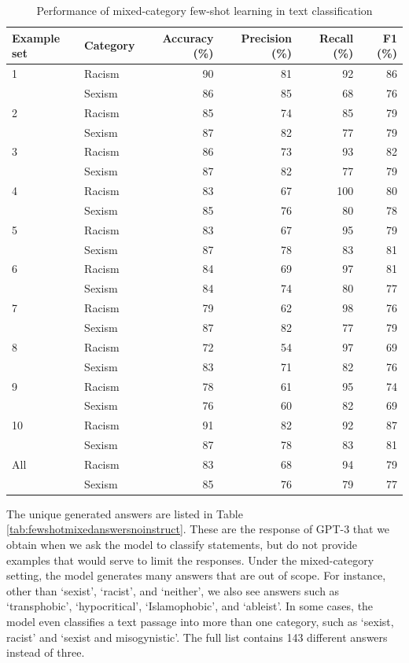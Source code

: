 \documentclass[12pt,]{article}
\begin{document}
\begin{table}

\caption{\label{tab:fewshotmixed-summary}Performance of mixed-category few-shot learning in text classification}
\centering
\begin{tabular}[t]{llrrrr}
\toprule
Example set & Category & Accuracy (\%) & Precision (\%) & Recall (\%) & F1 (\%)\\
\midrule
1 & Racism & 90 & 81 & 92 & 86\\
 & Sexism & 86 & 85 & 68 & 76\\
\midrule
2 & Racism & 85 & 74 & 85 & 79\\
 & Sexism & 87 & 82 & 77 & \vphantom{2} 79\\
\midrule
3 & Racism & 86 & 73 & 93 & 82\\
 & Sexism & 87 & 82 & 77 & \vphantom{1} 79\\
\midrule
4 & Racism & 83 & 67 & 100 & 80\\
 & Sexism & 85 & 76 & 80 & 78\\
\midrule
5 & Racism & 83 & 67 & 95 & 79\\
 & Sexism & 87 & 78 & 83 & \vphantom{1} 81\\
\midrule
6 & Racism & 84 & 69 & 97 & 81\\
 & Sexism & 84 & 74 & 80 & 77\\
\midrule
7 & Racism & 79 & 62 & 98 & 76\\
 & Sexism & 87 & 82 & 77 & 79\\
\midrule
8 & Racism & 72 & 54 & 97 & 69\\
 & Sexism & 83 & 71 & 82 & 76\\
\midrule
9 & Racism & 78 & 61 & 95 & 74\\
 & Sexism & 76 & 60 & 82 & 69\\
\midrule
10 & Racism & 91 & 82 & 92 & 87\\
 & Sexism & 87 & 78 & 83 & 81\\
\midrule
All & Racism & 83 & 68 & 94 & 79\\
 & Sexism & 85 & 76 & 79 & 77\\
\bottomrule
\end{tabular}
\end{table}

The unique generated answers are listed in Table \ref{tab:fewshotmixedanswersnoinstruct}. These are the response of GPT-3 that we obtain when we ask the model to classify statements, but do not provide examples that would serve to limit the responses. Under the mixed-category setting, the model generates many answers that are out of scope. For instance, other than `sexist', `racist', and `neither', we also see answers such as `transphobic', `hypocritical', `Islamophobic', and `ableist'. In some cases, the model even classifies a text passage into more than one category, such as `sexist, racist' and `sexist and misogynistic'. The full list contains 143 different answers instead of three.
\end{document}
